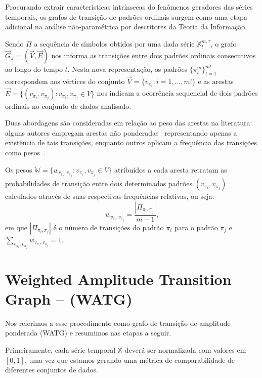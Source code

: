 \documentclass[12pt]{article}
\begin{document}
Procurando extrair características intrínsecas do fenômenos geradores das séries temporais, os grafos de transição de padrões ordinais surgem como uma etapa adicional na análise não-paramétrica por descritores da Teoria da Informação.

Sendo $\Pi$ a sequência de símbolos obtidos por uma dada série $\mathbb{X}_t^{m,\tau}$, o grafo $\vec{G}_{\pi} = (\vec{V}, \vec{E})$ nos informa as transições entre dois padrões ordinais consecutivos ao longo do tempo $t$.
Nesta nova representação, os padrões $\{\pi_t^m\}_{t=1}^{m!}$ correspondem aos vértices do conjunto $\vec{V} = \{ v_{\pi_i}:i = 1, \dots, m!\}$ e as arestas $\vec{E} = \{(v_{\pi_i}, v_{\pi_j}): v_{\pi_i}, v_{\pi_j} \in V\}$ nos indicam a ocorrência sequencial de dois padrões ordinais no conjunto de dados analisado.

Duas abordagens são consideradas em relação ao peso das arestas na literatura: alguns autores empregam arestas não ponderadas~\citep{McCullough2015lagged, Kulp2016ordinal} representando apenas a existência de tais transições, enquanto outros aplicam a frequência das transições como pesos~\citep{Sorrentino2015periodic, Zhang2017ConstructingOP}.


Os pesos $\mathbb{W} = \{w_{v_{\pi_i}, v_{\pi_j}}: v_{\pi_i}, v_{\pi_j} \in V\}$  atribuídos a cada aresta retratam as probabilidades de transição entre dois determinados padrões  $(v_{\pi_i}, v_{\pi_j})$ calculados através de suas respectivas frequências relativas, ou seja:
\begin{equation}
    w_{v_{\pi_i}, v_{\pi_j}} = \frac{|\Pi_{\pi_i,\pi_j}|}{m-1},
\end{equation}
em que $|\Pi_{\pi_i,\pi_j}|$ é o número de transições do padrão $\pi_i$ para o padrão $\pi_j$ e $\sum_{v_{\pi_i}, v_{\pi_j}}w_{v_{\pi_i}, v_{\pi_j}} = 1$.

\section{Weighted Amplitude Transition Graph -- (WATG)}\label{WATG}

Nos referimos a esse procedimento como grafo de transição de amplitude ponderada (WATG) e resumimos nas etapas a seguir. 

Primeiramente, cada série temporal $\mathbb{X}$ deverá ser normalizada com valores em $[0,1]$, uma vez que estamos gerando uma métrica de comparabilidade de diferentes conjuntos de dados.
\end{document}
